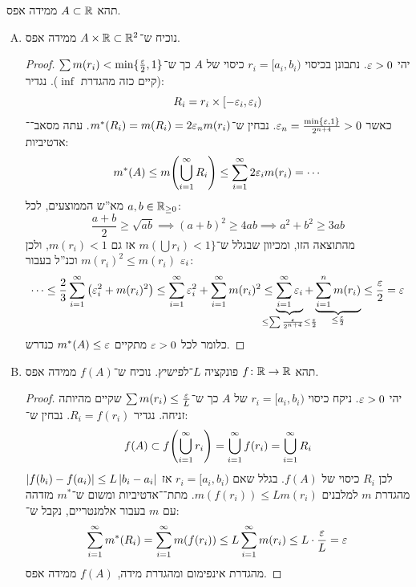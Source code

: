 \documentclass[]{../../../../tex/classes/homework}
\begin{document}
	\section{}
	תהא $A \subset \R$ ממידה אפס. 
	\begin{enumerate}[(A)]
		\item נוכיח ש־$A \times \R \subset \R^{2}$ ממידה אפס. \begin{proof}
			יהי $\eg > 0$. נתבונן בכיסוי $r_i = [a_i, b_i)$ כיסוי של $A$ כך ש־$\sum m(r_i) < \min\{\frac{\eg}{2}, 1\}$ (קיים כזה מהגדרת $\inf$). נגדיר: 
			\[ R_i = r_i \times [-\eg_i, \eg_i) \]
			כאשר $\eg_n = \frac{\min\{\eg, 1\}}{2^{n + 4}} > 0$. נבחין ש־$m^*(R_i) = m(R_i) = 2\eg_nm(r_i)$. עתה מסאב־\ס־אדטיביות: 
			\[ m^*(A) \le m\!\cl{\bigcup_{i = 1}^{\infty}R_i} \le \sum_{i = 1}^{\infty}2 \eg_i m( r_i) = \cdots \]
			מא''ש הממוצעים, לכל $a, b \in \R_{\ge 0}$: 
			\[ \frac{a + b}{2} \ge \sqrt{ab} \implies (a + b)^{2} \ge 4ab \implies a^2 \!+ b^2 \ge 3ab \]
			מהתוצאה הזו, ומכיוון שבגלל ש־$m(\bigcup r_i) < 1\}$ אז גם $m(r_i) < 1$, ולכן $m(r_i)^{2} \le m(r_i)$ וכנ''ל בעבור $\eg_i$: 
			\[ \cdots \le \frac{2}{3}\sum_{i = 1}^{\infty}\cl{\eg_i^2  + m(r_i)^2} \le \sum_{i = 1}^{\infty}\eg_i^{2} + \sum_{i = 1}^{\infty}m(r_i)^{2} \le \underbrace{\sum_{i = 1}^{\infty}\eg_i}_{\mathclap{\le \sum\frac{\eg}{2^{n + 4}} \le \frac{\eg}{2}}} + \underbrace{\sum_{i = 1}^{n}m(r_i)}_{\le \frac{\eg}{2}} \le \frac{\eg}{2} = \eg \]
			כלומר לכל $\eg > 0$ מתקיים $m^*(A) \le \eg$ כנדרש. 
		\end{proof}
		\item תהא $f \co \R \to \R$ פונקציה $L$־לפישיץ. נוכיח ש־$f(A)$ ממידה אפס. \begin{proof}
			יהי $\eg> 0$. ניקח כיסוי $r_i =[a_i, b_i)$ של $A$ כך ש־$\sum m(r_i) \le \frac{\eg}{L}$ שקיים מהיותה זניחה. נגדיר $R_i = f(r_i)$. נבחין ש־: 
			\[ f(A) \subset f\!\cl{\bigcup_{i = 1}^{\infty} r_i} = \bigcup_{i = 1}^{\infty}f(r_i) = \bigcup_{i = 1}^{\infty}R_i \]
			לכן $R_i$ כיסוי של $f(A)$. בגלל שאם $r_i = [a_i, b_i)$ אז $\sof{f(b_i) - f(a_i)} \le L\sof{b_i - a_i}$ מהגדרת $m$ למלבנים $m(f(r_i)) \le Lm(r_i)$. מתת־\ס־אדטיביות ומשום ש־$m^*$ מזדהה עם $m$ בעבור אלמנטריים, נקבל ש־: 
			\[ \sum_{i = 1}^{\infty}m^*(R_i) = \sum_{i = 1}^{\infty}m(f(r_i)) \le L\sum_{i = 1}^{\infty}m(r_i) \le L \cdot \frac{\eg}{L} = \eg \]
			מהגדרת אינפימום ומהגדרת מידה, $f(A)$ ממידה אפס. 
		\end{proof}
	\end{enumerate}
	
\end{document}
